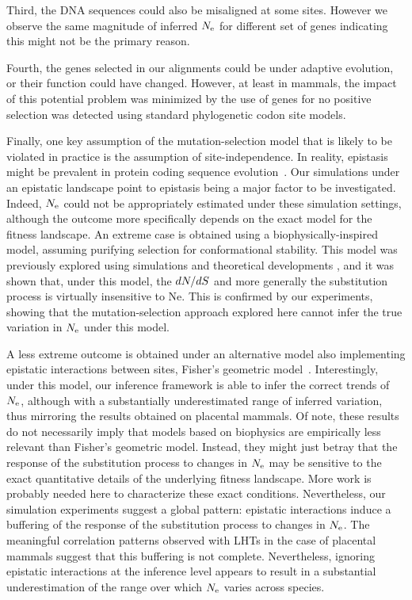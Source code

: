 Third, the DNA sequences could also be misaligned at some sites.
However we observe the same magnitude of inferred $N_{\text{e}}$ for different set of genes indicating this might not be the primary reason.

Fourth, the genes selected in our alignments could be under adaptive evolution, or their function could have changed.
However, at least in mammals, the impact of this potential problem was minimized by the use of genes for no positive selection was detected using standard phylogenetic codon site models.

Finally, one key assumption of the mutation-selection model that is likely to be violated in practice is the assumption of site-independence.
In reality, epistasis might be prevalent in protein coding sequence evolution~\citep{Pollock2014,Shah2015}.
Our simulations under an epistatic landscape point to epistasis being a major factor to be investigated.
Indeed, $N_{\text{e}}$ could not be appropriately estimated under these simulation settings, although the outcome more specifically depends on the exact model for the fitness landscape.
An extreme case is obtained using a biophysically-inspired model, assuming purifying selection for conformational stability.
This model was previously explored using simulations and theoretical developments \citet{Goldstein2013}, and it was shown that, under this model, the $dN/dS$ and more generally the substitution process is virtually insensitive to Ne.
This is confirmed by our experiments, showing that the mutation-selection approach explored here cannot infer the true variation in $N_{\text{e}}$ under this model.

A less extreme outcome is obtained under an alternative model also implementing epistatic interactions between sites, Fisher’s geometric model~\citep{Tenaillon2014,Blanquart2016}.
Interestingly, under this model, our inference framework is able to infer the correct trends of $N_{\text{e}}$, although with a substantially underestimated range of inferred variation, thus mirroring the results obtained on placental mammals.
Of note, these results do not necessarily imply that models based on biophysics are empirically less relevant than Fisher’s geometric model.
Instead, they might just betray that the response of the substitution process to changes in $N_{\text{e}}$ may be sensitive to the exact quantitative details of the underlying fitness landscape.
More work is probably needed here to characterize these exact conditions.
Nevertheless, our simulation experiments suggest a global pattern: epistatic interactions induce a buffering of the response of the substitution process to changes in $N_{\text{e}}$.
The meaningful correlation patterns observed with LHTs in the case of placental mammals suggest that this buffering is not complete.
Nevertheless, ignoring epistatic interactions at the inference level appears to result in a substantial underestimation of the range over which $N_{\text{e}}$ varies across species.

